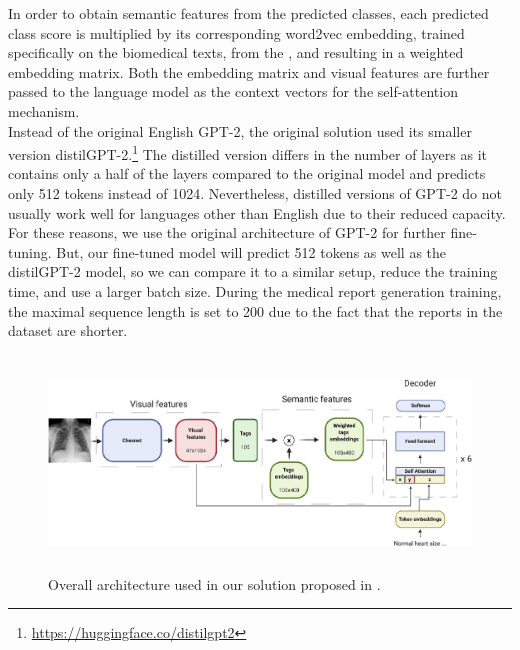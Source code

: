 In order to obtain semantic features from the predicted classes, each predicted class score is multiplied by its corresponding word2vec\citep{mikolov2013distributed} embedding, trained specifically on the biomedical texts, from the \citet{mcdonald2018deep}, and resulting in a weighted embedding matrix. Both the embedding matrix and visual features are further passed to the language model as the context vectors for the self-attention mechanism.\\

Instead of the original English GPT-2, the original solution used its smaller version distilGPT-2.\footnote[2]{\url{https://huggingface.co/distilgpt2}} The distilled version differs in the number of layers as it contains only a half of the layers compared to the original model and predicts only 512 tokens instead of 1024. Nevertheless, distilled versions of GPT-2 do not usually work well for languages other than English due to their reduced capacity. For these reasons, we use the original architecture of GPT-2 for further fine-tuning. But, our fine-tuned model will predict 512 tokens as well as the distilGPT-2 model, so we can compare it to a similar setup, reduce the training time, and use a larger batch size. During the medical report generation training, the maximal sequence length is set to 200 due to the fact that the reports in the dataset are shorter.\\
 
\begin{figure}[h]\centering
\includegraphics[width=145mm, height=57mm]{../img/OmarArchitecture}
\caption{Overall architecture used in our solution proposed in \citet{alfarghaly2021automated}.}
\label{fig01:OmarArchitecutre}
\end{figure}

